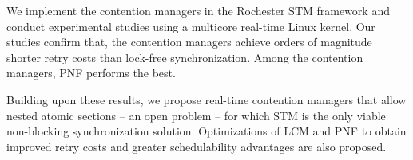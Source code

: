 \documentclass[12pt,english]{report}
\begin{document}
We implement the contention managers in the Rochester STM framework and conduct experimental studies using a multicore real-time Linux kernel. Our studies confirm that, the contention managers achieve orders of magnitude shorter retry costs than lock-free synchronization. Among the contention managers, PNF performs the best.

Building upon these results, we propose real-time contention managers that allow nested atomic sections -- an open problem -- for which STM is the only viable non-blocking synchronization solution. Optimizations of LCM and PNF to obtain improved retry costs and greater schedulability advantages are also proposed. 


\vfill







%


\pagestyle{myheadings}


\end{document}

